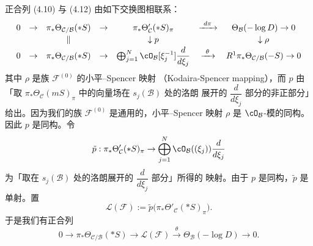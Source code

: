 正合列 (4.10) 与 (4.12) 由如下交换图相联系：
\[
  \begin{array}{ccccccc}
  0 & \to & \pi_*\Theta_{\mathcal{C}/\mathcal{B}}(*S) & \to &
  \pi_*\Theta'_\mathcal{C}(*S)_\pi & \xrightarrow{\ d\pi\ } &
  \Theta_\mathcal{B}(-\log D)\to 0\\[2pt]
  & & \| & & \downarrow p & & \downarrow\rho\\[2pt]
  0 & \to & \pi_*\Theta_{\mathcal{C}/\mathcal{B}}(*S) & \to &
  \bigoplus_{j=1}^N\cO_\mathcal{B}[\xi_j^{-1}]\dfrac{d}{d\xi_j}
  & \xrightarrow{\ \theta\ } &
  R^1\pi_*\Theta_{\mathcal{C}/\mathcal{B}}(-S)\to 0
  \end{array}
\]
其中 $\rho$ 是族 $\mathcal{F}^{(0)}$ 的小平–Spencer 映射
（Kodaira-Spencer mapping），而 $p$ 由「取
$\pi_*\Theta_\mathcal{C}(mS)_\pi$ 中的向量场在 $s_j(\mathcal{B})$ 处的洛朗
展开的 $\dfrac{d}{d\xi_j}$ 部分的非正部分」给出。因为我们的族
$\mathcal{F}^{(0)}$ 是通用的，小平–Spencer 映射 $\rho$ 是
$\cO_\mathcal{B}$-模的同构。因此 $p$ 是同构。令
\[
  \tilde{p} : \pi_*\Theta'_\mathcal{C}(*S)_\pi\to\bigoplus_{j=1}^N
  \cO_\mathcal{B}((\xi_j))\frac{d}{d\xi_j}
\]
为「取在 $s_j(\mathcal{B})$ 处的洛朗展开的 $\dfrac{d}{d\xi_j}$ 部分」所得的
映射。由于 $p$ 是同构，$\tilde{p}$ 是单射。置
\[
  \mathcal{L}(\mathcal{F}):=\tilde{p}\bigl(\pi_*\Theta'_\mathcal{C}(*S)_\pi
  \bigr) .
\]
于是我们有正合列
\begin{equation}
  0\to\pi_*\Theta_{\mathcal{C}/\mathcal{B}}(*S)\to\mathcal{L}(\mathcal{F})
  \xrightarrow{\ \theta\ }\Theta_\mathcal{B}(-\log D)\to 0 . \tag{4.15}
\end{equation}

